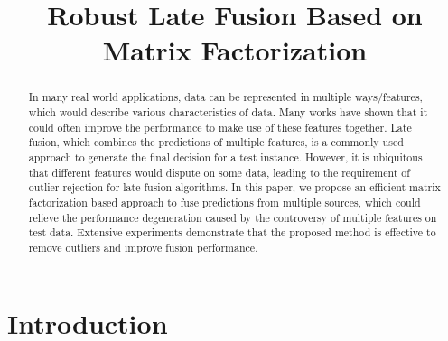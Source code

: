 \documentclass[letterpaper]{article}
\begin{document}
%



\title{Robust Late Fusion Based on Matrix Factorization}


\maketitle



\begin{abstract}
In many real world applications, data can be represented in multiple ways/features, which would describe various characteristics of data.
Many works have shown that it could often improve the performance to make use of these features together.
Late fusion, which combines the predictions of multiple features, is a commonly used approach to generate the final decision for a test instance.
However, it is ubiquitous that different features would dispute on some data, leading to the requirement of outlier rejection for late fusion algorithms.
In this paper, we propose an efficient matrix factorization based approach to fuse predictions from multiple sources, which could
relieve the performance degeneration caused by the controversy of multiple features on test data.
Extensive experiments demonstrate that the proposed method is effective to remove outliers and improve fusion performance.

\end{abstract}




\section{Introduction}
\end{document}
